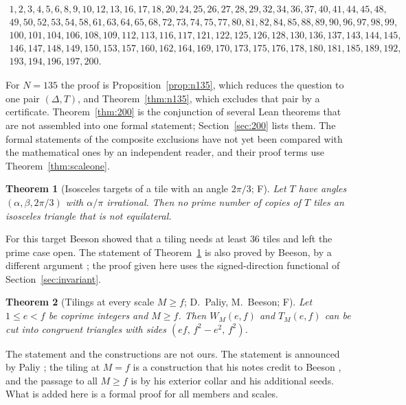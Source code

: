 \documentclass[11pt,reqno]{amsart}
\theoremstyle{plain}
\newtheorem{theorem}{Theorem}[section]
\theoremstyle{definition}
\newcommand{\sF}{\textup{\textsf{F}}}
\begin{document}
\begin{table}[ht]
\centering
\[
\begin{array}{l}
1,2,3,4,5,6,8,9,10,12,13,16,17,18,20,24,25,26,27,28,29,32,34,36,37,40,41,44,45,48,\\
49,50,52,53,54,58,61,63,64,65,68,72,73,74,75,77,80,81,82,84,85,88,89,90,96,97,98,99,\\
100,101,104,106,108,109,112,113,116,117,121,122,125,126,128,130,136,137,143,144,145,\\
146,147,148,149,150,153,157,160,162,164,169,170,173,175,176,178,180,181,185,189,192,\\
193,194,196,197,200.
\end{array}
\]
\caption{The tile counts $N\le200$ (Theorem~\ref{thm:200}).}\label{tab:200}
\end{table}

For $N=135$ the proof is Proposition~\ref{prop:n135}, which reduces the question to one pair $(\Delta,T)$, and
Theorem~\ref{thm:n135}, which excludes that pair by a certificate. Theorem~\ref{thm:200} is the conjunction of several Lean
theorems that are not assembled into one formal statement; Section~\ref{sec:200} lists them. The formal
statements of the composite exclusions have not yet been compared with the mathematical ones by an independent reader, and
their proof terms use Theorem~\ref{thm:scaleone}.

\begin{theorem}[Isosceles targets of a tile with an angle $2\pi/3$; \sF]\label{thm:iso}
Let $T$ have angles $(\alpha,\beta,2\pi/3)$ with $\alpha/\pi$ irrational. Then no prime number of copies of
$T$ tiles an isosceles triangle that is not equilateral.
\end{theorem}

For this target Beeson \cite{BeesonIso} showed that a tiling needs at least $36$ tiles and left the prime
case open. The statement of Theorem~\ref{thm:iso} is also proved by Beeson, by a different argument
\cite[Thms.~8 and~10]{BeesonNoPrime}; the proof given here uses the signed-direction functional of
Section~\ref{sec:invariant}.

\begin{theorem}[Tilings at every scale $M\ge f$; D.~Paliy, M.~Beeson; \sF]\label{thm:existence}
Let $1\le e<f$ be coprime integers and $M\ge f$. Then $W_M(e,f)$ and $T_M(e,f)$ can be cut into congruent
triangles with sides $(ef,\,f^2-e^2,\,f^2)$.
\end{theorem}

The statement and the constructions are not ours. The statement is announced by Paliy \cite{PaliyLedger};
the tiling at $M=f$ is a construction that his notes credit to Beeson \cite[Thm.~11]{BeesonIII}, and the
passage to all $M\ge f$ is by his exterior collar and his additional seeds. What is added here is a formal
proof for all members and scales.
\end{document}
